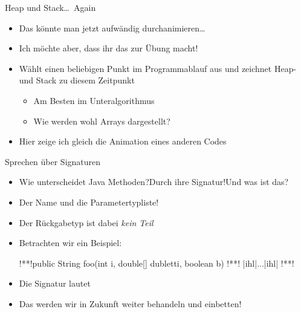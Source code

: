 {\AddonFrame
\begin{frame}{Heap und Stack\ldots\ Again}
    \begin{itemize}
        \itemsep12pt
        \item Das könnte man jetzt aufwändig durchanimieren\ldots
        \item Ich möchte aber, dass ihr das zur Übung macht!
        \item Wählt einen beliebigen  Punkt im Programmablauf aus und zeichnet Heap- und Stack zu diesem Zeitpunkt \begin{itemize}
            \item Am Besten im Unteralgorithmus
            \item Wie werden wohl  Arrays dargestellt?
        \end{itemize}
        \item Hier zeige ich gleich die Animation eines anderen Codes 
    \end{itemize}
\end{frame}

\begin{frame}[fragile]{Sprechen über Signaturen}
\SetupLstHl
\begin{itemize}[<+(1)->]
    \itemsep6pt
    \item Wie unterscheidet Java Methoden?\quad\pause Durch ihre Signatur!\quad\pause Und was ist das?
    \item Der Name und die Parametertypliste!\quad {}
    \item Der Rückgabetyp ist dabei \textit{kein Teil} 
    \item Betrachten wir ein Beispiel:
\begin{plainjava}[aboveskip=0pt]
!**!public String foo(int i, double[] dubletti, boolean b) {
!**!    |ihl|...|ihl|
!**!}
\end{plainjava}
    \item Die Signatur lautet 
    \item Das werden wir in Zukunft weiter behandeln und einbetten!
\end{itemize}
\end{frame}

}
